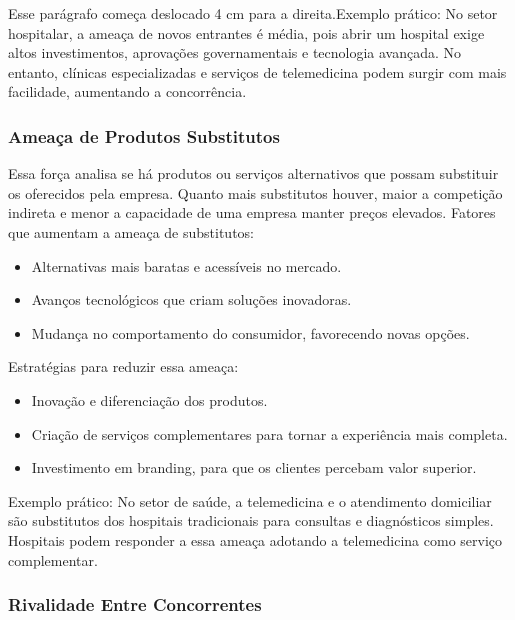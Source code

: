 \documentclass[11pt]{article}
\begin{document}
\begingroup
\leftskip=4cm
\parindent=0pt
Esse parágrafo começa deslocado 4 cm para a direita.Exemplo prático: No setor hospitalar, a ameaça de novos entrantes é média, pois abrir um hospital exige altos investimentos, aprovações governamentais e tecnologia avançada. No entanto, clínicas especializadas e serviços de telemedicina podem surgir com mais facilidade, aumentando a concorrência.
\par
\endgroup
\subsubsection{Ameaça de Produtos Substitutos}
\label{sec:org3f412b3}

Essa força analisa se há produtos ou serviços alternativos que possam substituir os oferecidos pela empresa. Quanto mais substitutos houver, maior a competição indireta e menor a capacidade de uma empresa manter preços elevados.
Fatores que aumentam a ameaça de substitutos:

\begin{itemize}
\item Alternativas mais baratas e acessíveis no mercado.
\item Avanços tecnológicos que criam soluções inovadoras.
\item Mudança no comportamento do consumidor, favorecendo novas opções.
\end{itemize}

Estratégias para reduzir essa ameaça:

\begin{itemize}
\item Inovação e diferenciação dos produtos.
\item Criação de serviços complementares para tornar a experiência mais completa.
\item Investimento em branding, para que os clientes percebam valor superior.
\end{itemize}

\begingroup
\leftskip=4cm
\parindent=0pt
Exemplo prático: No setor de saúde, a telemedicina e o atendimento domiciliar são substitutos dos hospitais tradicionais para consultas e diagnósticos simples. Hospitais podem responder a essa ameaça adotando a telemedicina como serviço complementar.
\par
\endgroup
\subsubsection{Rivalidade Entre Concorrentes}
\label{sec:orge534aea}
\end{document}
